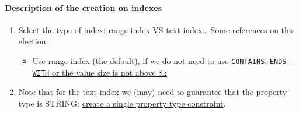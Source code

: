 \documentclass{article}
\begin{document}
\paragraph{Description of the creation on indexes\\}

\begin{enumerate}
  \item Select the type of index: range index VS text index\dots
  Some references on this election:
  \begin{itemize}
    \item \href{https://stackoverflow.com/questions/77833955/neo4j-range-index-vs-text-index-when-checking-membership-in-list-of-only-strin}{Use range index (the default), if we do not need to use
    \texttt{CONTAINS}, \texttt{ENDS WITH} or the value size is not above
    8k}.
  \end{itemize}
  \item Note that for the text index we (may) need to guarantee that the property type is STRING: \href{https://neo4j.com/docs/cypher-manual/current/constraints/managing-constraints/#create-single-property-type-constraint}{create a single property type constraint}.
\end{enumerate}

\end{document}
